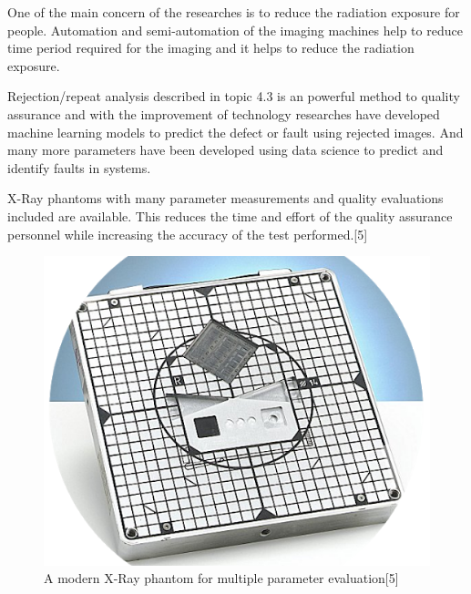 \documentclass[12pt]{article}
\begin{document}
One of the main concern of the researches is to reduce the radiation exposure for people. Automation and semi-automation of the imaging machines help to reduce time period required for the imaging and it helps to reduce the radiation exposure. 

Rejection/repeat analysis described in topic 4.3 is an powerful method to quality assurance and with the improvement of technology researches have developed machine learning models to predict the defect or fault using rejected images. And many more parameters have been developed using data science to predict and identify faults in systems.

X-Ray phantoms with many parameter measurements and quality evaluations included are available. This reduces the time and effort of the quality assurance personnel while increasing the accuracy of the test performed.[5]

\begin{figure}[h!]
  \centering
  \includegraphics[width=0.46\linewidth]{phantom.png}
  \caption{\small{A modern X-Ray phantom for multiple parameter evaluation[5]}}
  \label{fig:A modern X-Ray phantom for multiple parameter evaluation [7]}
\end{figure}

\pagebreak
\end{document}
